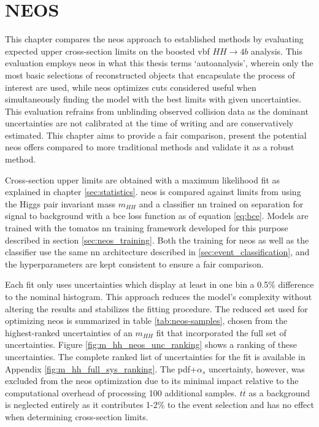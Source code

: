 \chapter{NEOS}
This chapter compares the \ac{neos} approach to established methods by evaluating expected upper cross-section limits on the boosted \ac{vbf} $HH\rightarrow4b$ analysis. This evaluation employs \ac{neos} in what this thesis terms `autoanalysis', wherein only the most basic selections of reconstructed objects that encapsulate the process of interest are used, while \ac{neos} optimizes cuts considered useful when simultaneously finding the model with the best limits with given uncertainties. This evaluation refrains from unblinding observed collision data as the dominant uncertainties are not calibrated at the time of writing and are conservatively estimated. This chapter aims to provide a fair comparison, present the potential \ac{neos} offers compared to more traditional methods and validate it as a robust method.

Cross-section upper limits are obtained with a maximum likelihood fit as explained in chapter \ref{sec:statistics}. \ac{neos} is compared against limits from using the Higgs pair invariant mass $m_{HH}$ and a classifier \ac{nn} trained on separation for signal to background with a \ac{bce} loss function as of equation \ref{eq:bce}. Models are trained with the \ac{tomatos} \ac{nn} training framework developed for this purpose \citep{tomatos} described in section \ref{sec:neos_training}. Both the training for \ac{neos} as well as the classifier use the same \ac{nn} architecture described in \ref{sec:event_classification}, and the hyperparameters are kept consistent to ensure a fair comparison.

Each fit only uses uncertainties which display at least in one bin a 0.5\% difference to the nominal histogram. This approach reduces the model's complexity without altering the results and stabilizes the fitting procedure. The reduced set used for optimizing \ac{neos} is summarized in table \ref{tab:neos-samples}, chosen from the highest-ranked uncertainties of an $m_{HH}$ fit that incorporated the full set of uncertainties. Figure \ref{fig:m_hh_neos_unc_ranking} shows a ranking of these uncertainties. The complete ranked list of uncertainties for the \mhh fit is available in Appendix \ref{fig:m_hh_full_sys_ranking}. The \ac{pdf}+$\alpha_s$ uncertainty, however, was excluded from the \ac{neos} optimization due to its minimal impact relative to the computational overhead of processing 100 additional samples. $t\overline{t}$ as a background is neglected entirely as it contributes 1-2\% to the event selection and has no effect when determining cross-section limits.

